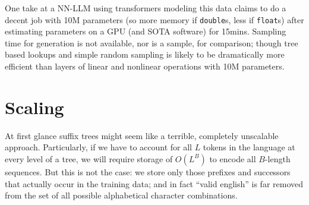 \documentclass[11pt, oneside]{amsart}   	%
\begin{document}
One take at a NN-LLM using transformers modeling this data claims to do a decent job with 10M parameters (so more memory if \texttt{double}s, less if \texttt{float}s) after estimating parameters on a GPU (and SOTA software) for 15mins. Sampling time for generation is not available, nor is a sample, for comparison; though tree based lookups and simple random sampling is likely to be dramatically more efficient than layers of linear and nonlinear operations with 10M parameters. 

\section{Scaling}

At first glance suffix trees might seem like a terrible, completely unscalable approach. Particularly, if we have to account for all $L$ tokens in the language at every level of a tree, we will require storage of $O(L^B)$ to encode all $B$-length sequences. But this is not the case: we store only those prefixes and successors that actually occur in the training data; and in fact ``valid english'' is far removed from the set of all possible alphabetical character combinations. 
\end{document}
